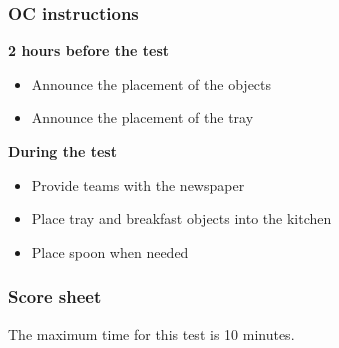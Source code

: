 \subsubsection{OC instructions}

\textbf{2 hours before the test}
\begin{itemize}
\item Announce the placement of the objects
\item Announce the placement of the tray

\end{itemize}
\textbf{During the test}
\begin{itemize}
\item Provide teams with the newspaper
\item Place tray and breakfast objects into the kitchen
\item Place spoon when needed
\end{itemize}

\subsubsection{Score sheet}
The maximum time for this test is 10 minutes.

